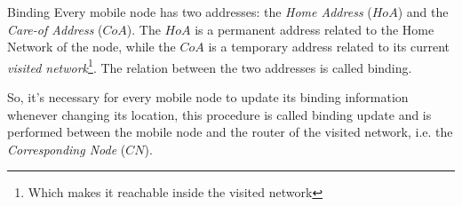 \documentclass[10pt]{beamer}
\begin{document}
\begin{frame}{Binding}
	Every mobile node has two addresses: the \textit{Home Address} ($HoA$) and the \textit{Care-of Address} ($CoA$). The $HoA$ is a permanent address related to the Home Network of the node, while the $CoA$ is a temporary address related to its current \textit{visited network}\footnote{Which makes it reachable inside the visited network}. The relation between the two addresses is called \alert{binding}. \par 
	So, it's necessary for every mobile node to update its binding information whenever changing its location, this procedure is called \alert{binding update} and is performed between the mobile node and the router of the visited network, i.e. the \textit{Corresponding Node} ($CN$).
\end{frame}

\end{document}
